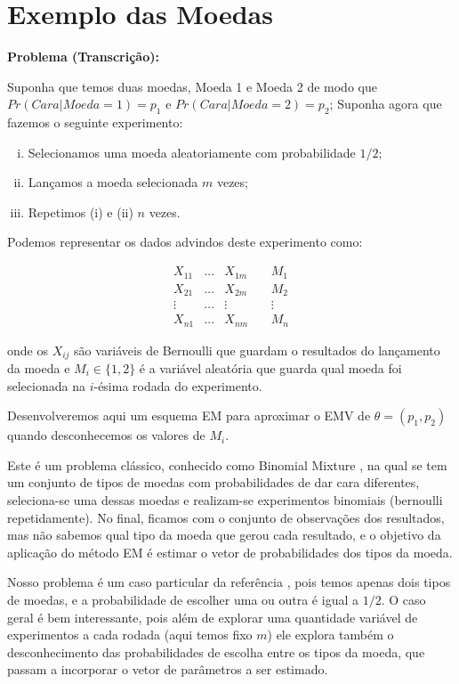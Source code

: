 \documentclass[12pt]{article}
\begin{document}
\section{Exemplo das Moedas}

\textbf{Problema (Transcrição):}

Suponha que temos duas moedas, Moeda 1 e Moeda 2 de modo que $Pr(Cara|Moeda = 1) =p_1$ e $Pr(Cara|Moeda =2) =p_2$; Suponha agora que fazemos o seguinte experimento:

\begin{enumerate}[(i)]
    \item Selecionamos uma moeda aleatoriamente com probabilidade $1/2$;
    \item Lançamos a moeda selecionada $m$ vezes;
    \item Repetimos (i) e (ii) $n$ vezes.
\end{enumerate}

Podemos representar os dados advindos deste experimento como:

$$\begin{matrix} X_{11}&...&X_{1m}&~&M_1\\
 X_{21}&...&X_{2m}&~&M_2\\
 \vdots &...&\vdots &~&\vdots\\
  X_{n1}&...&X_{nm}&~&M_n
\end{matrix}$$

onde os $X_{ij}$ são variáveis de Bernoulli que guardam o resultados do lançamento da moeda e $M_i\in \{1,2\}$ é a variável aleatória que guarda qual moeda foi selecionada na $i$-ésima rodada do experimento.

Desenvolveremos aqui um esquema EM para aproximar o EMV de $\theta=(p_1,p_2)$ quando desconhecemos os valores de $M_i$.

Este é um problema clássico, conhecido como Binomial Mixture \cite{bin}, na qual se tem um conjunto de tipos de moedas com probabilidades de dar cara diferentes, seleciona-se uma dessas moedas e realizam-se experimentos binomiais (bernoulli repetidamente). No final, ficamos com o conjunto de observações dos resultados, mas não sabemos qual tipo da moeda que gerou cada resultado, e o objetivo da aplicação do método EM é estimar o vetor de probabilidades dos tipos da moeda.

Nosso problema é um caso particular da referência \cite{bin}, pois temos apenas dois tipos de moedas, e a probabilidade de escolher uma ou outra é igual a $1/2$. O caso geral é bem interessante, pois além de explorar uma quantidade variável de experimentos a cada rodada (aqui temos fixo $m$) ele explora também o desconhecimento das probabilidades de escolha entre os tipos da moeda, que passam a incorporar o vetor de parâmetros a ser estimado.
\end{document}
